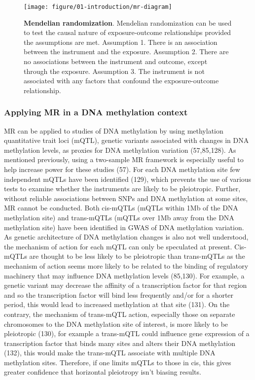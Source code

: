 \documentclass[11pt,twoside]{bristolthesis}
\begin{document}
\begin{figure}[!h]

{\centering \texttt{[image: figure/01-introduction/mr-diagram]} 

}

\caption[Mendelian randomization]{\textbf{Mendelian randomization}. Mendelian randomization can be used to test the causal nature of exposure-outcome relationships provided the assumptions are met. Assumption 1. There is an association between the instrument and the exposure. Assumption 2. There are no associations between the instrument and outcome, except through the exposure. Assumption 3. The instrument is not associated with any factors that confound the exposure-outcome relationship.}\label{fig:mr-diagram}
\end{figure}
\hypertarget{applying-mr-in-a-dna-methylation-context}{%
\subsubsection{Applying MR in a DNA methylation context}\label{applying-mr-in-a-dna-methylation-context}}

MR can be applied to studies of DNA methylation by using methylation quantitative trait loci (mQTL), genetic variants associated with changes in DNA methylation levels, as proxies for DNA methylation variation (57,85,128). As mentioned previously, using a two-sample MR framework is especially useful to help increase power for these studies (57). For each DNA methylation site few independent mQTLs have been identified (129), which prevents the use of various tests to examine whether the instruments are likely to be pleiotropic. Further, without reliable associations between SNPs and DNA methylation at some sites, MR cannot be conducted. Both cis-mQTLs (mQTLs within 1Mb of the DNA methylation site) and trans-mQTLs (mQTLs over 1Mb away from the DNA methylation site) have been identified in GWAS of DNA methylation variation. As genetic architecture of DNA methylation changes is also not well understood, the mechanism of action for each mQTL can only be speculated at present. Cis-mQTLs are thought to be less likely to be pleiotropic than trans-mQTLs as the mechanism of action seems more likely to be related to the binding of regulatory machinery that may influence DNA methylation levels (85,130). For example, a genetic variant may decrease the affinity of a transcription factor for that region and so the transcription factor will bind less frequently and/or for a shorter period, this would lead to increased methylation at that site (131). On the contrary, the mechanism of trans-mQTL action, especially those on separate chromosomes to the DNA methylation site of interest, is more likely to be pleiotropic (130), for example a trans-mQTL could influence gene expression of a transcription factor that binds many sites and alters their DNA methylation (132), this would make the trans-mQTL associate with multiple DNA methylation sites. Therefore, if one limits mQTLs to those in cis, this gives greater confidence that horizontal pleiotropy isn't biasing results.
\end{document}
